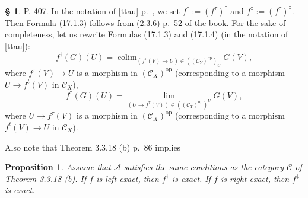 \documentclass[12pt]{article}
\newtheorem{prop}[thm]{Proposition}
\theoremstyle{remark}
\theoremstyle{definition}
\newtheorem{s}[thm]{\S}
\newcommand{\A}{\mathcal A}
\newcommand{\C}{\mathcal C}
\DeclareMathOperator*{\co}{colim}
\DeclareMathOperator{\op}{op}
\DeclareMathOperator{\PSh}{PSh}
\begin{document}
\begin{s}\label{fdagger} 
P. 407. In the notation of \eqref{ttau} p.~\pageref{ttau}, we set $f^\dagger:=(f^\tau)^\dagger$ and $f^\ddagger:=(f^\tau)^\ddagger$. Then Formula (17.1.3) follows from (2.3.6) p.~52 of the book. For the sake of completeness, let us rewrite Formulas (17.1.3) and (17.1.4) (in the notation of \eqref{ttau}):
$$
f^\dagger(G)(U)=\co_{(f^\tau(V)\to U)\in((\C_Y)^{\op})_U}G(V),
$$
where $f^\tau(V)\to U$ is a morphism in $(\C_X)^{\op}$ (corresponding to a morphism $U\to f^t(V)$ in $\C_X$),
$$
f^\ddagger(G)(U)=\lim_{(U\to f^\tau(V))\in((\C_Y)^{\op})^U}G(V),
$$
%
where $U\to f^\tau(V)$ is a morphism in $(\C_X)^{\op}$ (corresponding to a morphism $f^t(V)\to U$ in $\C_X$). 
%
\begin{comment}

Instead of:

One has the functors 
$$
f^t{}_*:\PSh(X,\A)\to\PSh(Y,\A),
$$
$$
f^t{}^\dagger:\PSh(X,\A)\to\PSh(Y,\A),
$$
$$
f^t{}^\ddagger:\PSh(X,\A)\to\PSh(Y,\A).
$$ 
it would be better (I think) to write:

One has the functors 
$$
f^{t\op}{}_*:\PSh(X,\A)\to\PSh(Y,\A),
$$
$$
f^{t\op}{}^\dagger:\PSh(X,\A)\to\PSh(Y,\A),
$$
$$
f^{t\op}{}^\ddagger:\PSh(X,\A)\to\PSh(Y,\A).
$$ 

We write for short 
$$
f_*:=f^{t\op}{}_*,\quad f^\dagger:=f^{t\op}{}^\dagger,\quad f^\ddagger:=f^{t\op}{}^\ddagger.
$$
%
\end{comment}
%

Also note that Theorem 3.3.18 (b) p.~86 implies 
%
\begin{prop}\label{407}
Assume that $\A$ satisfies the same conditions as the category $\C$ of Theorem 3.3.18 (b). If $f$ is left exact, then $f^\dagger$ is exact. If $f$ is right exact, then $f^\ddagger$ is exact. 
\end{prop}
\end{s}
%
%
\end{document}
